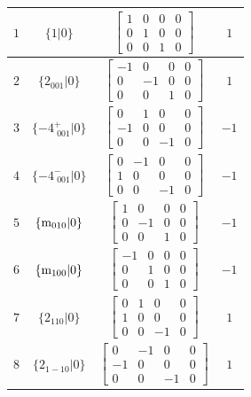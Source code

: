 \documentclass[fleqn,8pt]{jsarticle}
\begin{document}
\begin{longtable}{cccc}
$ 1 $ & $ \{1|0\} $ & $ \begin{bmatrix} 1 & 0 & 0 & 0 \\ 0 & 1 & 0 & 0 \\ 0 & 0 & 1 & 0 \end{bmatrix} $ & $ 1 $ \\ \hline
$ 2 $ & $ \{2{}_{001}|0\} $ & $ \begin{bmatrix} -1 & 0 & 0 & 0 \\ 0 & -1 & 0 & 0 \\ 0 & 0 & 1 & 0 \end{bmatrix} $ & $ 1 $ \\ \hline
$ 3 $ & $ \{-4^{+}_{\,\,001}|0\} $ & $ \begin{bmatrix} 0 & 1 & 0 & 0 \\ -1 & 0 & 0 & 0 \\ 0 & 0 & -1 & 0 \end{bmatrix} $ & $ -1 $ \\ \hline
$ 4 $ & $ \{-4^{-}_{\,\,001}|0\} $ & $ \begin{bmatrix} 0 & -1 & 0 & 0 \\ 1 & 0 & 0 & 0 \\ 0 & 0 & -1 & 0 \end{bmatrix} $ & $ -1 $ \\ \hline
$ 5 $ & $ \{{\rm m}_{010}|0\} $ & $ \begin{bmatrix} 1 & 0 & 0 & 0 \\ 0 & -1 & 0 & 0 \\ 0 & 0 & 1 & 0 \end{bmatrix} $ & $ -1 $ \\ \hline
$ 6 $ & $ \{{\rm m}_{100}|0\} $ & $ \begin{bmatrix} -1 & 0 & 0 & 0 \\ 0 & 1 & 0 & 0 \\ 0 & 0 & 1 & 0 \end{bmatrix} $ & $ -1 $ \\ \hline
$ 7 $ & $ \{2{}_{110}|0\} $ & $ \begin{bmatrix} 0 & 1 & 0 & 0 \\ 1 & 0 & 0 & 0 \\ 0 & 0 & -1 & 0 \end{bmatrix} $ & $ 1 $ \\ \hline
$ 8 $ & $ \{2{}_{1-10}|0\} $ & $ \begin{bmatrix} 0 & -1 & 0 & 0 \\ -1 & 0 & 0 & 0 \\ 0 & 0 & -1 & 0 \end{bmatrix} $ & $ 1 $ \\
\end{longtable}
\end{document}
